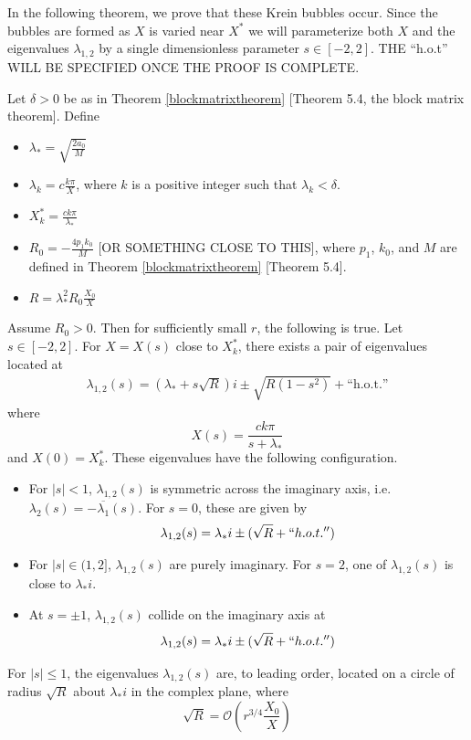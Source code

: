 \documentclass[thesis.tex]{subfiles}
\begin{document}
In the following theorem, we prove that these Krein bubbles occur. Since the bubbles are formed as $X$ is varied near $X^*$ we will parameterize both $X$ and the eigenvalues $\lambda_{1,2}$ by a single dimensionless parameter $s \in [-2, 2]$. THE ``h.o.t'' WILL BE SPECIFIED ONCE THE PROOF IS COMPLETE.

\begin{theorem}
Let $\delta > 0$ be as in Theorem \ref{blockmatrixtheorem} [Theorem 5.4, the block matrix theorem]. Define
\begin{itemize}
\item $\lambda_* = \sqrt{\frac{2 a_0}{M}}$
\item $\lambda_k = c \frac{k \pi}{X}$, where $k$ is a positive integer such that $\lambda_k < \delta$.
\item $X_k^* = \frac{c k \pi}{\lambda_*}$
\item $R_0 = -\frac{4 p_1 k_0}{M}$ [OR SOMETHING CLOSE TO THIS], where $p_1$, $k_0$, and $M$ are defined in Theorem \ref{blockmatrixtheorem} [Theorem 5.4].
\item $R = \lambda_*^2 R_0 \frac{X_0}{X}$ 
\end{itemize}
Assume $R_0 > 0$. Then for sufficiently small $r$, the following is true. Let $s \in [-2, 2]$. For $X = X(s)$ close to $X_k^*$, there exists a pair of eigenvalues located at
\begin{align*}
\lambda_{1,2}(s) = \left( \lambda_* + s \sqrt{R} \right) i \pm \sqrt{R(1 - s^2)} + \text{``h.o.t.''}
\end{align*}
where
\[
X(s) = \frac{c k \pi}{s + \lambda_*}
\]
and $X(0) = X_k^*$. These eigenvalues have the following configuration.
\begin{itemize}
\item For $|s| < 1$, $\lambda_{1,2}(s)$ is symmetric across the imaginary axis, i.e. $\lambda_2(s) = -\overline{\lambda_1}(s)$. For $s = 0$, these are given by
\[
\lambda_{1,2}(s) = \lambda_* i \pm (\sqrt{R} + ``h.o.t.'')
\]
\item For $|s| \in (1, 2]$, $\lambda_{1,2}(s)$
are purely imaginary. For $s = 2$, one of $\lambda_{1,2}(s)$ is close to $\lambda_* i$.
\item At $s = \pm 1$, $\lambda_{1,2}(s)$ collide on the imaginary axis at 
\[
\lambda_{1,2}(s) = \lambda_* i \pm (\sqrt{R} + ``h.o.t.'')
\]
\end{itemize}
For $|s| \leq 1$, the eigenvalues $\lambda_{1,2}(s)$ are, to leading order, located on a circle of radius $\sqrt{R}$ about $\lambda_* i$ in the complex plane, where
\[
\sqrt{R} = \mathcal{O}\left( r^{3/4}\frac{X_0}{X} \right)
\]
\end{theorem}
\end{document}
